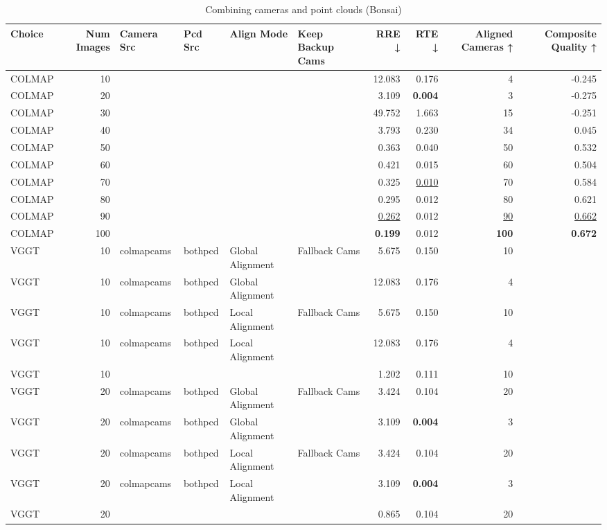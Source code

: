 \begin{table}[H]
\caption{Combining cameras and point clouds (Bonsai)}
\label{tab:07_combined_full_bonsai}
\begin{tabular}{lrllllrrrr}
\toprule
Choice & Num Images & Camera Src & Pcd Src & Align Mode & Keep Backup Cams & RRE ↓ & RTE ↓ & Aligned Cameras ↑ & Composite Quality ↑ \\
\midrule
COLMAP & 10 &  &  &  &  & 12.083 & 0.176 & 4 & -0.245 \\
COLMAP & 20 &  &  &  &  & 3.109 & \textbf{0.004} & 3 & -0.275 \\
COLMAP & 30 &  &  &  &  & 49.752 & 1.663 & 15 & -0.251 \\
COLMAP & 40 &  &  &  &  & 3.793 & 0.230 & 34 & 0.045 \\
COLMAP & 50 &  &  &  &  & 0.363 & 0.040 & 50 & 0.532 \\
COLMAP & 60 &  &  &  &  & 0.421 & 0.015 & 60 & 0.504 \\
COLMAP & 70 &  &  &  &  & 0.325 & \underline{0.010} & 70 & 0.584 \\
COLMAP & 80 &  &  &  &  & 0.295 & 0.012 & 80 & 0.621 \\
COLMAP & 90 &  &  &  &  & \underline{0.262} & 0.012 & \underline{90} & \underline{0.662} \\
COLMAP & 100 &  &  &  &  & \textbf{0.199} & 0.012 & \textbf{100} & \textbf{0.672} \\
VGGT & 10 & colmapcams & bothpcd & Global Alignment & Fallback Cams & 5.675 & 0.150 & 10 &  \\
VGGT & 10 & colmapcams & bothpcd & Global Alignment &  & 12.083 & 0.176 & 4 &  \\
VGGT & 10 & colmapcams & bothpcd & Local Alignment & Fallback Cams & 5.675 & 0.150 & 10 &  \\
VGGT & 10 & colmapcams & bothpcd & Local Alignment &  & 12.083 & 0.176 & 4 &  \\
VGGT & 10 &  &  &  &  & 1.202 & 0.111 & 10 &  \\
VGGT & 20 & colmapcams & bothpcd & Global Alignment & Fallback Cams & 3.424 & 0.104 & 20 &  \\
VGGT & 20 & colmapcams & bothpcd & Global Alignment &  & 3.109 & \textbf{0.004} & 3 &  \\
VGGT & 20 & colmapcams & bothpcd & Local Alignment & Fallback Cams & 3.424 & 0.104 & 20 &  \\
VGGT & 20 & colmapcams & bothpcd & Local Alignment &  & 3.109 & \textbf{0.004} & 3 &  \\
VGGT & 20 &  &  &  &  & 0.865 & 0.104 & 20 &  \\

\end{tabular}
\end{table}
